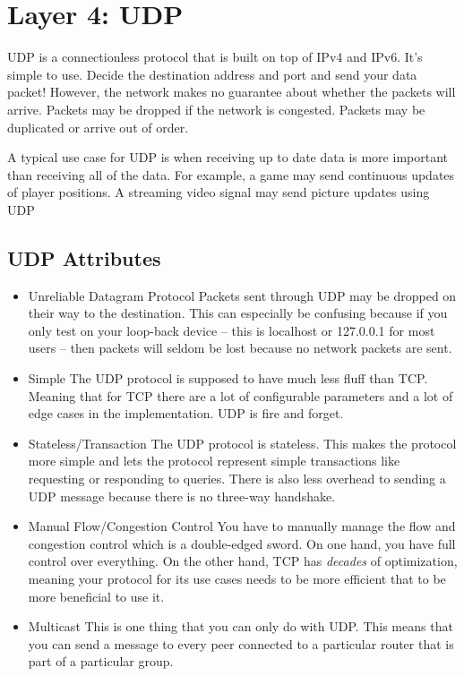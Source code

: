 \section{Layer 4: UDP}

UDP is a connectionless protocol that is built on top of IPv4 and IPv6.
It's simple to use.
Decide the destination address and port and send your data packet!
However, the network makes no guarantee about whether the packets will arrive.
Packets may be dropped if the network is congested.
Packets may be duplicated or arrive out of order.

A typical use case for UDP is when receiving up to date data is more important than receiving all of the data.
For example, a game may send continuous updates of player positions.
A streaming video signal may send picture updates using UDP

\subsection{UDP Attributes}

\begin{itemize}
\item Unreliable Datagram Protocol
  Packets sent through UDP may be dropped on their way to the destination.
  This can especially be confusing because if you only test on your loop-back device -- this is localhost or 127.0.0.1 for most users -- then packets will seldom be lost because no network packets are sent.
\item Simple
  The UDP protocol is supposed to have much less fluff than TCP.
  Meaning that for TCP there are a lot of configurable parameters and a lot of edge cases in the implementation.
  UDP is fire and forget.
\item Stateless/Transaction
  The UDP protocol is stateless.
  This makes the protocol more simple and lets the protocol represent simple transactions like requesting or responding to queries.
  There is also less overhead to sending a UDP message because there is no three-way handshake.
\item Manual Flow/Congestion Control
  You have to manually manage the flow and congestion control which is a double-edged sword.
  On one hand, you have full control over everything.
  On the other hand, TCP has \textit{decades} of optimization, meaning your protocol for its use cases needs to be more efficient that to be more beneficial to use it.
\item Multicast
  This is one thing that you can only do with UDP.
  This means that you can send a message to every peer connected to a particular router that is part of a particular group.
\end{itemize}

